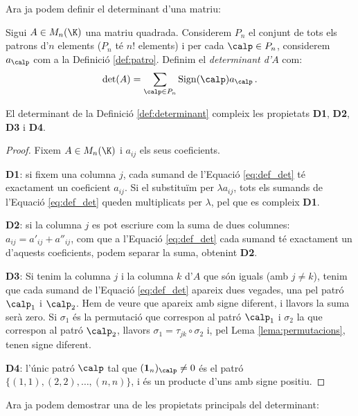 Ara ja podem definir el determinant d'una matriu:
\begin{definicio}\label{def:determinant}
Sigui $A\in M_n(\K)$ una matriu quadrada. Considerem $P_n$ el conjunt de tots els patrons d'$n$ elements ($P_n$ té $n!$ elements) i per cada $\calp\in P_n$, considerem $a_\calp$ com a la Definició \ref{def:patro}. Definim el \emph{determinant d'$A$} com:
\begin{equation} \label{eq:def_det}
    \det(A)=\sum_{\calp \in P_n} \sign(\calp) a_\calp \,.
\end{equation}
\end{definicio}

\begin{teorema}
El determinant de la Definició \ref{def:determinant} compleix les propietats \textbf{D1}, \textbf{D2}, \textbf{D3} i \textbf{D4}.
\end{teorema}
\begin{proof}
    Fixem $A\in M_n(\K)$ i $a_{ij}$ els seus coeficients.
    
    \textbf{D1}: si fixem una columna $j$, cada sumand de l'Equació \eqref{eq:def_det} té exactament un coeficient $a_{ij}$. Si el substituïm per $\lambda a_{ij}$, tots els sumands de l'Equació \eqref{eq:def_det} queden multiplicats per $\lambda$, pel que es compleix \textbf{D1}.
    
    \textbf{D2}: si la columna $j$ es pot escriure com la suma de dues columnes: $a_{ij}=a'_{ij}+a''_{ij}$, com que a l'Equació \eqref{eq:def_det} cada sumand té exactament un d'aquests coeficients, podem separar la suma, obtenint \textbf{D2}.
    
    \textbf{D3}: Si tenim la columna $j$ i la columna $k$ d'$A$ que són iguals (amb $j\neq k$), tenim que cada sumand de l'Equació \eqref{eq:def_det} apareix dues vegades, una pel patró $\calp_1$ i $\calp_2$. Hem de veure que apareix amb signe diferent, i llavors la suma serà zero. Si $\sigma_1$ és la permutació que correspon al patró $\calp_1$ i $\sigma_2$ la que correspon al patró $\calp_2$, llavors $\sigma_1=\tau_{jk}\circ\sigma_2$ i, pel Lema \ref{lema:permutacions}, tenen signe diferent. 
    
    \textbf{D4}: l'únic patró $\calp$ tal que $(\1_n)_\calp\neq 0$ és el patró $\{(1,1),(2,2),\dots, (n,n)\}$, i és un producte d'uns amb signe positiu.
\end{proof}

Ara ja podem demostrar una de les propietats principals del determinant:

